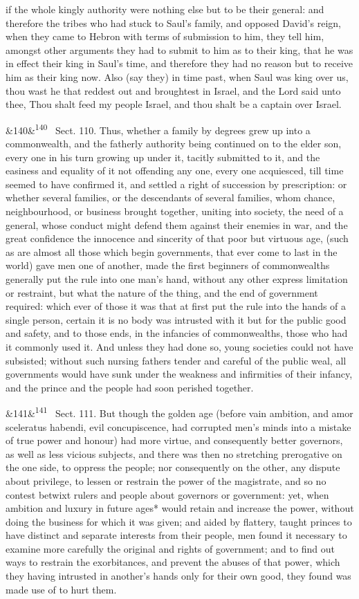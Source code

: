 \documentclass[12pt]{article}
\newcommand{\para}[1][]{\par\noindent\ifx&#1&\else\textsuperscript{\footnotesize #1}~\fi}
\begin{document}
if the whole kingly authority were nothing else but to be their general: and therefore the tribes who had stuck to Saul's family, and opposed David's reign, when they came to Hebron with terms of submission to him, they tell him, amongst other arguments they had to submit to him as to their king, that he was in effect their king in Saul's time, and therefore they had no reason but to receive him as their king now. Also (say they) in time past, when Saul was king over us, thou wast he that reddest out and broughtest in Israel, and the Lord said unto thee, Thou shalt feed my people Israel, and thou shalt be a captain over Israel.

\para[140] Sect. 110. Thus, whether a family by degrees grew up into a commonwealth, and the fatherly authority being continued on to the elder son, every one in his turn growing up under it, tacitly submitted to it, and the easiness and equality of it not offending any one, every one acquiesced, till time seemed to have confirmed it, and settled a right of succession by prescription: or whether several families, or the descendants of several families, whom chance, neighbourhood, or business brought together, uniting into society, the need of a general, whose conduct might defend them against their enemies in war, and the great confidence the innocence and sincerity of that poor but virtuous age, (such as are almost all those which begin governments, that ever come to last in the world) gave men one of another, made the first beginners of commonwealths generally put the rule into one man's hand, without any other express limitation or restraint, but what the nature of the thing, and the end of government required: which ever of those it was that at first put the rule into the hands of a single person, certain it is no body was intrusted with it but for the public good and safety, and to those ends, in the infancies of commonwealths, those who had it commonly used it. And unless they had done so, young societies could not have subsisted; without such nursing fathers tender and careful of the public weal, all governments would have sunk under the weakness and infirmities of their infancy, and the prince and the people had soon perished together.

\para[141] Sect. 111. But though the golden age (before vain ambition, and amor sceleratus habendi, evil concupiscence, had corrupted men's minds into a mistake of true power and honour) had more virtue, and consequently better governors, as well as less vicious subjects, and there was then no stretching prerogative on the one side, to oppress the people; nor consequently on the other, any dispute about privilege, to lessen or restrain the power of the magistrate, and so no contest betwixt rulers and people about governors or government: yet, when ambition and luxury in future ages* would retain and increase the power, without doing the business for which it was given; and aided by flattery, taught princes to have distinct and separate interests from their people, men found it necessary to examine more carefully the original and rights of government; and to find out ways to restrain the exorbitances, and prevent the abuses of that power, which they having intrusted in another's hands only for their own good, they found was made use of to hurt them.
\end{document}
